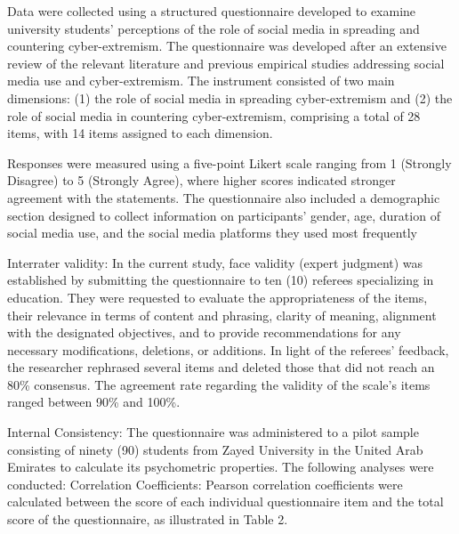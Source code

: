 \documentclass{NSP1}
\begin{document}
Data were collected using a structured questionnaire developed to examine university students' perceptions of the role of social media in spreading and countering cyber-extremism. The questionnaire was developed after an extensive review of the relevant literature and previous empirical studies addressing social media use and cyber-extremism. The instrument consisted of two main dimensions: (1) the role of social media in spreading cyber-extremism and (2) the role of social media in countering cyber-extremism, comprising a total of 28 items, with 14 items assigned to each dimension.

Responses were measured using a five-point Likert scale ranging from 1 (Strongly Disagree) to 5 (Strongly Agree), where higher scores indicated stronger agreement with the statements. The questionnaire also included a demographic section designed to collect information on participants' gender, age, duration of social media use, and the social media platforms they used most frequently

\par\medskip{}\smallskip

Interrater validity: In the current study, face validity (expert judgment) was established by submitting the questionnaire to ten (10) referees specializing in education. They were requested to evaluate the appropriateness of the items, their relevance in terms of content and phrasing, clarity of meaning, alignment with the designated objectives, and to provide recommendations for any necessary modifications, deletions, or additions. In light of the referees’ feedback, the researcher rephrased several items and deleted those that did not reach an 80\% consensus. The agreement rate regarding the validity of the scale's items ranged between 90\% and 100\%.

Internal Consistency: The questionnaire was administered to a pilot sample consisting of ninety (90) students from Zayed University in the United Arab Emirates to calculate its psychometric properties. The following analyses were conducted: Correlation Coefficients: Pearson correlation coefficients were calculated between the score of each individual questionnaire item and the total score of the questionnaire, as illustrated in Table 2.
\end{document}
